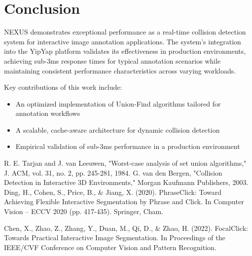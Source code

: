 \documentclass[10pt]{article}
\begin{document}
\begin{sloppypar}
\section{Conclusion}
NEXUS demonstrates exceptional performance as a real-time collision detection system for interactive image annotation applications. The system's integration into the YipYap platform validates its effectiveness in production environments, achieving sub-3ms response times for typical annotation scenarios while maintaining consistent performance characteristics across varying workloads.

Key contributions of this work include:
\begin{itemize}
    \item An optimized implementation of Union-Find algorithms tailored for annotation workflows
    \item A scalable, cache-aware architecture for dynamic collision detection
    \item Empirical validation of sub-3ms performance in a production environment
\end{itemize}
\end{sloppypar}


\begin{thebibliography}{99}
 R. E. Tarjan and J. van Leeuwen, "Worst-case analysis of set union algorithms," J. ACM, vol. 31, no. 2, pp. 245-281, 1984.
 G. van den Bergen, "Collision Detection in Interactive 3D Environments," Morgan Kaufmann Publishers, 2003.
Ding, H., Cohen, S., Price, B., \& Jiang, X. (2020). PhraseClick: Toward Achieving Flexible Interactive Segmentation by Phrase and Click. In Computer Vision -- ECCV 2020 (pp. 417-435). Springer, Cham.

Chen, X., Zhao, Z., Zhang, Y., Duan, M., Qi, D., \& Zhao, H. (2022). FocalClick: Towards Practical Interactive Image Segmentation. In Proceedings of the IEEE/CVF Conference on Computer Vision and Pattern Recognition.

\end{thebibliography}
\end{document}
